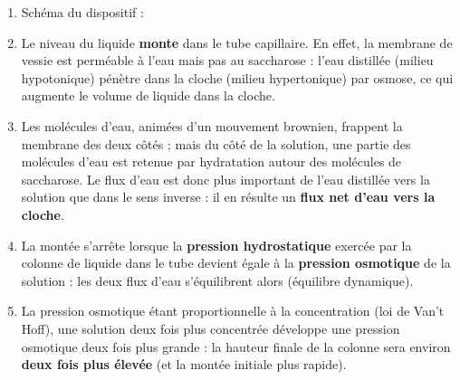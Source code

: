 \documentclass[11pt]{article}
\newcommand{\legende}[1]{\par\vspace{6pt}{\popsemi\fontsize{9}{11.5}\selectfont\color{popmuted}#1}}
\begin{document}
\begin{corrige}
\begin{enumerate}
\item Schéma du dispositif :

\begin{popfigure}
\end{popfigure}

\item Le niveau du liquide \textbf{monte} dans le tube capillaire. En effet, la membrane de vessie est perméable à l'eau mais pas au saccharose : l'eau distillée (milieu hypotonique) pénètre dans la cloche (milieu hypertonique) par osmose, ce qui augmente le volume de liquide dans la cloche.
\item Les molécules d'eau, animées d'un mouvement brownien, frappent la membrane des deux côtés ; mais du côté de la solution, une partie des molécules d'eau est retenue par hydratation autour des molécules de saccharose. Le flux d'eau est donc plus important de l'eau distillée vers la solution que dans le sens inverse : il en résulte un \textbf{flux net d'eau vers la cloche}.
\item La montée s'arrête lorsque la \textbf{pression hydrostatique} exercée par la colonne de liquide dans le tube devient égale à la \textbf{pression osmotique} de la solution : les deux flux d'eau s'équilibrent alors (équilibre dynamique).
\item La pression osmotique étant proportionnelle à la concentration (loi de Van't Hoff), une solution deux fois plus concentrée développe une pression osmotique deux fois plus grande : la hauteur finale de la colonne sera environ \textbf{deux fois plus élevée} (et la montée initiale plus rapide).
\end{enumerate}
\end{corrige}
\end{document}
